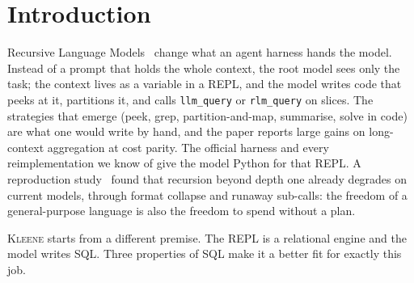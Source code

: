\documentclass[11pt,a4paper]{article}
\newcommand{\kleene}{\textsc{Kleene}}
\newcommand{\code}[1]{\texttt{#1}}
\begin{document}
\begin{abstract}
the SQL modes and loses four tasks. Luna and Haiku separate on accuracy, and
on the hard packs the gap between models (Opus 97\%, Haiku 30 to 95\%, Luna
0 to 62\%) is larger than any gap between modes. The playbook's clearest
wins are on the packs where the task is an aggregation or a draft: on
rubric-graded memos learning beats frozen 18/20 to 8/20 on Luna and 11/20
to 8/20 on Haiku, and on long-context aggregation 20/20 to 15/20 on Luna at
1.3 calls a task against 34. On memo drafting the playbook hurt Opus (10 to
4), the one reversal. On the recursion-depth packs no model recursed along
the tree: Opus solves all twenty tasks flat with recursive CTEs for \$1.85,
Haiku and Luna solve a fifth to a third, and only when the context no
longer fits one call does Luna open child sessions five levels deep (1\,634
of them), partitioning text rather than consolidating the tree. We report
the numbers with their confounds (one run per cell, a shared memo in the
first Haiku sweep, an untraced judge) and the harness fixes the runs
forced, among them a cost model that learns token rates from the trace
after a fixed rate had priced a cheap model out of recursing at all.
\end{abstract}

\section{Introduction}
\label{sec:intro}

Recursive Language Models~\citep{zhang2025rlm} change what an agent harness
hands the model. Instead of a prompt that holds the whole context, the root model
sees only the task; the context lives as a variable in a REPL, and the model
writes code that peeks at it, partitions it, and calls \code{llm\_query} or
\code{rlm\_query} on slices. The strategies that emerge (peek, grep,
partition-and-map, summarise, solve in code) are what one would write by hand,
and the paper reports large gains on long-context aggregation at cost parity.
The official harness and every reimplementation we know of give the model
Python for that REPL. A reproduction study~\citep{wang2026reproducing} found that
recursion beyond depth one already degrades on current models, through format
collapse and runaway sub-calls: the freedom of a general-purpose language is
also the freedom to spend without a plan.

\kleene{} starts from a different premise. The REPL is a relational engine and the
model writes SQL. Three properties of SQL make it a better fit for exactly this
job.
\end{document}
